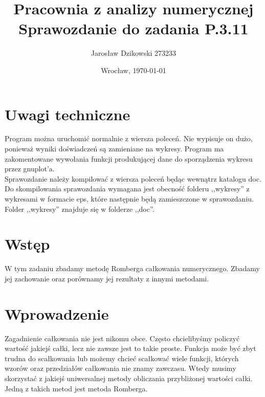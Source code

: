 \documentclass{article}
\author{Jarosław Dzikowski 273233}
\date{Wrocław, \today}
\title{\textbf{Pracownia z analizy numerycznej} \\ Sprawozdanie do zadania \textbf{P.3.11}}
\begin{document}
\maketitle
\section{Uwagi techniczne}
Program można uruchomić normalnie z wiersza poleceń. Nie wypisuje on dużo, ponieważ wyniki doświadczeń są zamieniane na wykresy. Program ma zakomentowane wywołania funkcji produkującej dane do sporządzenia wykresu przez gnuplot'a.\\

Sprawozdanie należy kompilować z wiersza poleceń będąc wewnątrz katalogu doc.
Do skompilowania sprawozdania wymagana jest obecność folderu ,,wykresy'' z wykresami w formacie eps, które następnie będą zamieszczone w sprawozdaniu. Folder ,,wykresy'' znajduje się w folderze ,,doc''.

\section{Wstęp}
W tym zadaniu zbadamy metodę Romberga całkowania numerycznego. Zbadamy jej zachowanie oraz porównamy jej rezultaty z innymi metodami.


\section{Wprowadzenie}
Zagadnienie całkowania nie jest nikomu obce. Często chcielibyśmy policzyć wartość jakiejś całki, lecz nie zawsze jest to takie proste.
Funkcja może być zbyt trudna do scałkowania lub możemy chcieć scałkować wiele funkcji, których wzorów oraz przedziałów całkowania nie znamy zawczasu.
Wtedy musimy skorzystać z jakiejś uniwersalnej metody obliczania przybliżonej wartości całki. Jedną z takich metod jest metoda Romberga.
\end{document}
